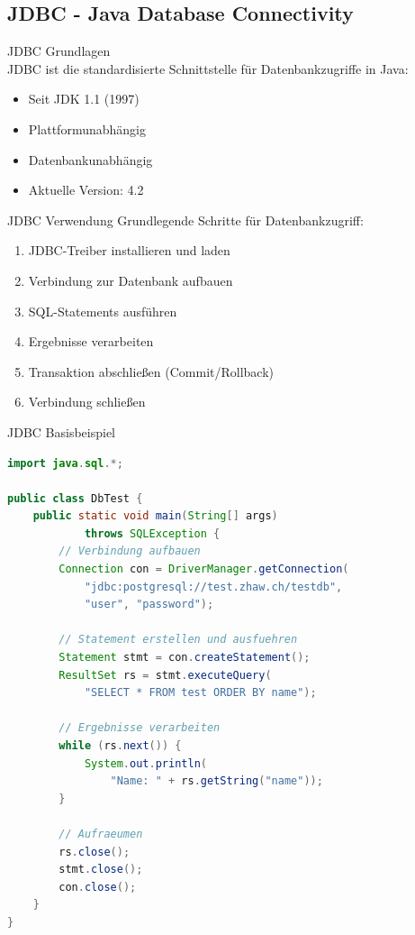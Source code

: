 \subsection{JDBC - Java Database Connectivity}

\begin{concept}{JDBC Grundlagen}\\
JDBC ist die standardisierte Schnittstelle für Datenbankzugriffe in Java:
\begin{itemize}
    \item Seit JDK 1.1 (1997)
    \item Plattformunabhängig
    \item Datenbankunabhängig
    \item Aktuelle Version: 4.2
\end{itemize}
\end{concept}

\begin{KR}{JDBC Verwendung}
Grundlegende Schritte für Datenbankzugriff:
\begin{enumerate}
    \item JDBC-Treiber installieren und laden
    \item Verbindung zur Datenbank aufbauen
    \item SQL-Statements ausführen
    \item Ergebnisse verarbeiten
    \item Transaktion abschließen (Commit/Rollback)
    \item Verbindung schließen
\end{enumerate}
\end{KR}

\begin{example}{JDBC Basisbeispiel}
\begin{lstlisting}[language=Java, style=base]
import java.sql.*;

public class DbTest {
    public static void main(String[] args) 
            throws SQLException {
        // Verbindung aufbauen
        Connection con = DriverManager.getConnection(
            "jdbc:postgresql://test.zhaw.ch/testdb",
            "user", "password");
            
        // Statement erstellen und ausfuehren
        Statement stmt = con.createStatement();
        ResultSet rs = stmt.executeQuery(
            "SELECT * FROM test ORDER BY name");
            
        // Ergebnisse verarbeiten
        while (rs.next()) {
            System.out.println(
                "Name: " + rs.getString("name"));
        }
        
        // Aufraeumen
        rs.close();
        stmt.close();
        con.close();
    }
}
\end{lstlisting}
\end{example}

